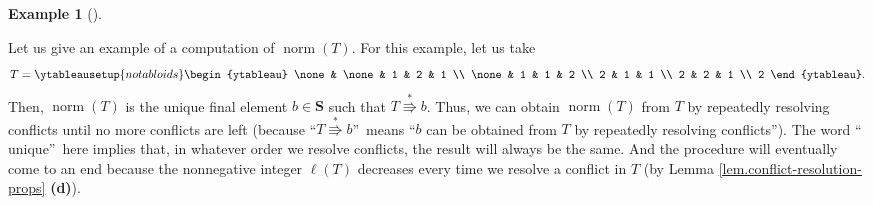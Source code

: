 \documentclass[numbers=enddot,12pt,final,onecolumn,notitlepage]{scrartcl}%
\theoremstyle{definition}
\newtheorem{exmp}[theo]{Example}
\newenvironment{example}[1][]
{\begin{exmp}[#1]\begin{leftbar}}
{\end{leftbar}\end{exmp}}
\newenvironment{verlong}{}{}
\begin{document}
\begin{verlong}
\begin{example}
Let us give an example of a computation of $\operatorname*{norm}\left(
T\right)  $. For this example, let us take%
\[
T=%
\ytableausetup{notabloids}
\begin{ytableau}
\none& \none& 1 & 2 & 1 \\
\none& 1 & 1 & 2 \\
2 & 1 & 1 \\
2 & 2 & 1 \\
2
\end{ytableau}%
.
\]
Then, $\operatorname*{norm}\left(  T\right)  $ is the unique final element
$b\in\mathbf{S}$ such that $T\overset{\ast}{\Rrightarrow}b$. Thus, we can
obtain $\operatorname*{norm}\left(  T\right)  $ from $T$ by repeatedly
resolving conflicts until no more conflicts are left (because
\textquotedblleft$T\overset{\ast}{\Rrightarrow}b$\textquotedblright\ means
\textquotedblleft$b$ can be obtained from $T$ by repeatedly resolving
conflicts\textquotedblright). The word \textquotedblleft
unique\textquotedblright\ here implies that, in whatever order we resolve
conflicts, the result will always be the same. And the procedure will
eventually come to an end because the nonnegative integer $\ell\left(
T\right)  $ decreases every time we resolve a conflict in $T$ (by Lemma
\ref{lem.conflict-resolution-props} \textbf{(d)}).


\end{example}
\end{verlong}
\end{document}
